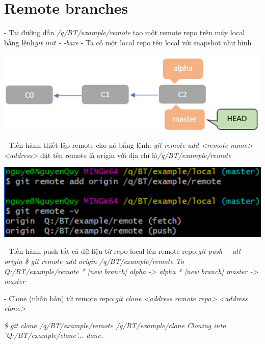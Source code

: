 \documentclass[12pt,a4paper]{report}
\begin{document}
	\label{fig:screenshot064}

	\vskip 0.4cm	\vskip 0.4cm
			\newpage			
\section{Remote branches}
\hspace{0.6cm}- Tại đường dẫn {\it /q/BT/example/remote} tạo một remote repo trên máy local bằng lệnh{\it git init - -bare} \vskip 0.4cm
- Ta có một local repo tên local với snapshot như hình\vskip 0.4cm

	\includegraphics[width=0.8\linewidth]{screenshot065}
	
	\label{fig:screenshot065}\vskip 0.4cm\vskip 0.4cm

- Tiến hành thiết lập remote cho nó bằng lệnh: {\it git remote add <remote  name> <address>} đặt tên remote là origin với địa chỉ là{\it /q/BT/example/remote}\vskip 0.4cm

	\includegraphics[width=0.8\linewidth]{screenshot066}

	\label{fig:screenshot066}
\vskip 0.4cm\vskip 0.4cm
- Tiến hành push tất cả dữ liệu từ repo local lên remote repo:{\it git push - -all origin}
\vskip 0.4cm
{\it  \hspace{1cm}\$ git remote add origin /q/BT/example/remote\vskip 0.1cm
 \hspace{1cm}To Q:/BT/example/remote\vskip 0.1cm
 \hspace{1cm}* [new branch]      alpha -> alpha\vskip 0.1cm
 \hspace{1cm}* [new branch]      master -> master}\vskip 0.4cm

 - Clone (nhân bản) từ remote repo:{\it git clone <address remote repo> <address clone>}\vskip 0.4cm
 
 {\it \hspace{1cm} \$ git clone /q/BT/example/remote /q/BT/example/clone\vskip 0.1cm
 \hspace{1cm} Cloning into 'Q:/BT/example/clone'...\vskip 0.1cm
 \hspace{1cm} done.}\vskip 0.4cm
 
\end{document}
